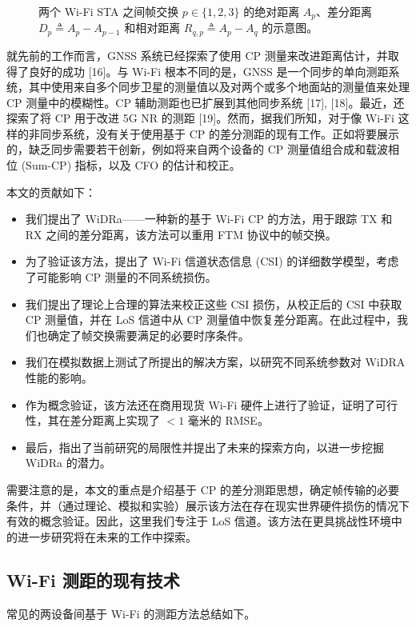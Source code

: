 \documentclass[journal]{IEEEtran}
\begin{document}
\begin{figure}[htbp]
\centering
{}
\caption{两个 Wi-Fi STA 之间帧交换 $p \in \{1, 2, 3\}$ 的绝对距离 $A_p$、差分距离 $D_p \triangleq A_p - A_{p-1}$ 和相对距离 $R_{q,p} \triangleq A_p - A_q$ 的示意图。}
\label{fig:fig2}
\end{figure}

就先前的工作而言，GNSS 系统已经探索了使用 CP 测量来改进距离估计，并取得了良好的成功 [16]。与 Wi-Fi 根本不同的是，GNSS 是一个同步的单向测距系统，其中使用来自多个同步卫星的测量值以及对两个或多个地面站的测量值来处理 CP 测量中的模糊性。CP 辅助测距也已扩展到其他同步系统 [17], [18]。最近，还探索了将 CP 用于改进 5G NR 的测距 [19]。然而，据我们所知，对于像 Wi-Fi 这样的非同步系统，没有关于使用基于 CP 的差分测距的现有工作。正如将要展示的，缺乏同步需要若干创新，例如将来自两个设备的 CP 测量值组合成和载波相位 (Sum-CP) 指标，以及 CFO 的估计和校正。

本文的贡献如下：
\begin{itemize}
    \item 我们提出了 WiDRa——一种新的基于 Wi-Fi CP 的方法，用于跟踪 TX 和 RX 之间的差分距离，该方法可以重用 FTM 协议中的帧交换。
    \item 为了验证该方法，提出了 Wi-Fi 信道状态信息 (CSI) 的详细数学模型，考虑了可能影响 CP 测量的不同系统损伤。
    \item 我们提出了理论上合理的算法来校正这些 CSI 损伤，从校正后的 CSI 中获取 CP 测量值，并在 LoS 信道中从 CP 测量值中恢复差分距离。在此过程中，我们也确定了帧交换需要满足的必要时序条件。
    \item 我们在模拟数据上测试了所提出的解决方案，以研究不同系统参数对 WiDRA 性能的影响。
    \item 作为概念验证，该方法还在商用现货 Wi-Fi 硬件上进行了验证，证明了可行性，其在差分距离上实现了 $<1$ 毫米的 RMSE。
    \item 最后，指出了当前研究的局限性并提出了未来的探索方向，以进一步挖掘 WiDRa 的潜力。
\end{itemize}

需要注意的是，本文的重点是介绍基于 CP 的差分测距思想，确定帧传输的必要条件，并（通过理论、模拟和实验）展示该方法在存在现实世界硬件损伤的情况下有效的概念验证。因此，这里我们专注于 LoS 信道。该方法在更具挑战性环境中的进一步研究将在未来的工作中探索。

\subsection{Wi-Fi 测距的现有技术}
常见的两设备间基于 Wi-Fi 的测距方法总结如下。
\end{document}
